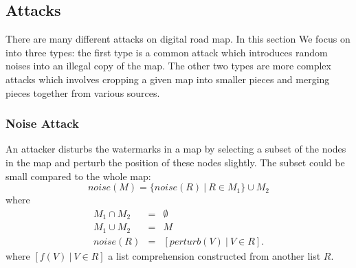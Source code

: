 \subsection{Attacks}
There are many different attacks on digital road map. In this section
We focus on into three types: the first type is a common attack which introduces
random noises into an illegal copy of the map. The other two types are more
complex attacks which involves cropping a given map into smaller pieces and merging
pieces together from various sources.

\subsubsection*{Noise Attack}
An attacker disturbs the watermarks in a map by selecting a subset of the nodes in
the map and perturb the position of these nodes slightly. The subset could be small
compared to the whole map: 
\[noise(M)= \{noise(R) ~|~ R \in M_1\} \cup M_2 \]
where
\begin{eqnarray*} 
M_1 \cap M_2 &=& \emptyset\\
M_1 \cup M_2 &=& M\\
noise(R) &=& [perturb(V)~ |~ V \in R].
\end{eqnarray*}
where $[f(V)~|~ V \in R ]$ a list comprehension constructed
from another list $R$.

